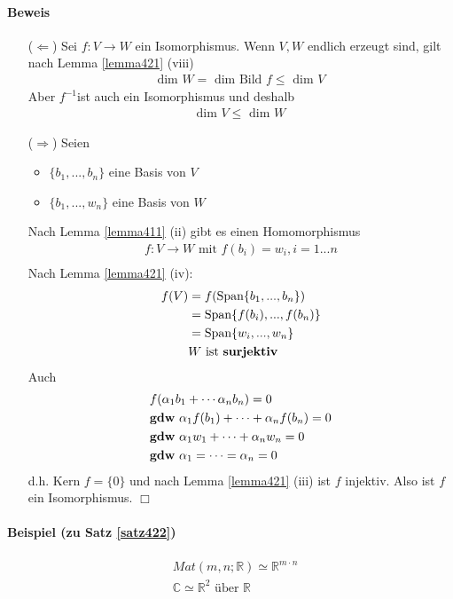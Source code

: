 \documentclass[11pt]{report}
\newcommand*\Zb[1] {\mathbb{#1}}
\newcommand*\f[1] {\textbf{#1}}
\begin{document}
\paragraph{Beweis}
\begin{itemize}
 \item[($\Leftarrow$)] Sei $f: V \rightarrow W$ ein Isomorphismus. Wenn $V,W$ endlich erzeugt sind, gilt nach Lemma \ref{lemma421} (viii)
\begin{align}
 \text{dim }W = \text{ dim Bild }f \leq \text{ dim }V 
\end{align}
Aber $f^{-1}$ist auch ein Isomorphismus und deshalb
\begin{align}
 \text{dim } V \leq \text{ dim } W
\end{align}
 \item[($\Rightarrow$)] Seien
\begin{itemize}
\item $\{b_1, ..., b_n\}$ eine Basis von $V$
\item $\{b_1, ..., w_n\}$ eine Basis von $W$
\end{itemize}
Nach Lemma \ref{lemma411} (ii) gibt es einen Homomorphismus
\begin{align}
 f: V \rightarrow W \text{ mit } f(b_i) = w_i, i=1...n \\
\end{align}
Nach Lemma \ref{lemma421} (iv):
\begin{align}
 f(V) &= f(\text{Span}\{b_1, ..., b_n\})\\
&= \text{Span}\{f(b_i), ..., f(b_n)\}\\
&= \text{Span}\{w_i, ..., w_n\}\\
&W \text{ ist \f{surjektiv}}
\end{align}
Auch 
\begin{align}
 &f(\alpha_1 b_1 + \cdots \alpha_n b_n) = 0 \\
 &\text{\f{gdw} } \alpha_1 f(b_1) + \cdots + \alpha_n f(b_n) = 0 \\
 &\text{\f{gdw} } \alpha_1 w_1 + \cdots + \alpha_n w_n = 0 \\
 &\text{\f{gdw} } \alpha_1 = \cdots = \alpha_n = 0
\end{align}
d.h. Kern $f = \{0\}$ und nach Lemma \ref{lemma421} (iii) ist $f$ injektiv. Also ist $f$ ein Isomorphismus. \hfill $\Box$
\end{itemize}

\paragraph{Beispiel (zu Satz \ref{satz422})}
\begin{align}
 &Mat(m,n;\Zb{R}) \simeq \Zb{R}^{m\cdot n}\\
 &\Zb{C} \simeq \Zb{R}^2 \text{ über }\Zb{R}
\end{align}
\end{document}
